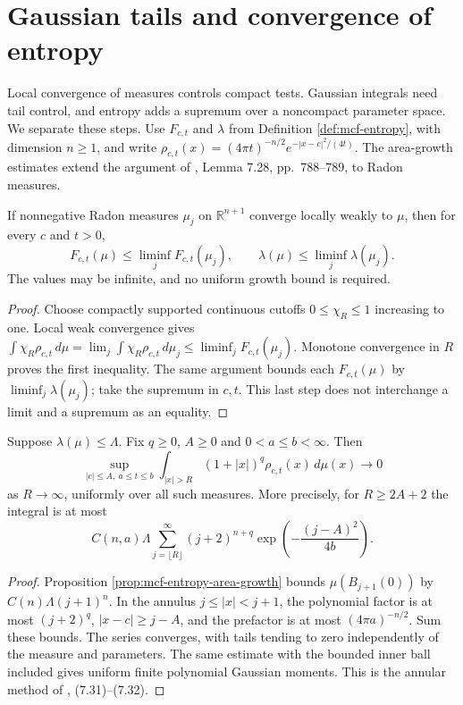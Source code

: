 \chapter{Gaussian tails and convergence of entropy}\label{sec:entropy-convergence}
Local convergence of measures controls compact tests. Gaussian integrals need tail control, and entropy adds a supremum over a noncompact parameter space. We separate these steps. Use $F_{c,t}$ and $\lambda$ from Definition \ref{def:mcf-entropy}, with dimension $n\geq1$, and write $\rho_{c,t}(x)=(4\pi t)^{-n/2}e^{-|x-c|^2/(4t)}$. The area-growth estimates extend the argument of \cite{CM12}, Lemma 7.28, pp.~788--789, to Radon measures.

\begin{proposition}\label{prop:entropy-lower-semicontinuity}
If nonnegative Radon measures $\mu_j$ on $\mathbb R^{n+1}$ converge locally weakly to $\mu$, then for every $c$ and $t>0$,
\[
 F_{c,t}(\mu)\leq\liminf_j F_{c,t}(\mu_j),\qquad
 \lambda(\mu)\leq\liminf_j\lambda(\mu_j).
\]
The values may be infinite, and no uniform growth bound is required.
\end{proposition}
\begin{proof}
Choose compactly supported continuous cutoffs $0\leq\chi_R\leq1$ increasing to one. Local weak convergence gives $\int\chi_R\rho_{c,t}\,d\mu=\lim_j\int\chi_R\rho_{c,t}\,d\mu_j\leq\liminf_jF_{c,t}(\mu_j)$. Monotone convergence in $R$ proves the first inequality. The same argument bounds each $F_{c,t}(\mu)$ by $\liminf_j\lambda(\mu_j)$; take the supremum in $c,t$. This last step does not interchange a limit and a supremum as an equality.
\end{proof}

\begin{lemma}\label{lem:entropy-gaussian-tails}
Suppose $\lambda(\mu)\leq\Lambda$. Fix $q\geq0$, $A\geq0$ and $0<a\leq b<\infty$. Then
\[
 \sup_{|c|\leq A,\ a\leq t\leq b}
 \int_{|x|>R}(1+|x|)^q\rho_{c,t}(x)\,d\mu(x)\longrightarrow0
\]
as $R\to\infty$, uniformly over all such measures. More precisely, for $R\geq2A+2$ the integral is at most
\[
 C(n,a)\Lambda\sum_{j=\lfloor R\rfloor}^{\infty}
 (j+2)^{n+q}\exp\left(-\frac{(j-A)^2}{4b}\right).
\]
\end{lemma}
\begin{proof}
Proposition \ref{prop:mcf-entropy-area-growth} bounds $\mu(B_{j+1}(0))$ by $C(n)\Lambda(j+1)^n$. In the annulus $j\leq|x|<j+1$, the polynomial factor is at most $(j+2)^q$, $|x-c|\geq j-A$, and the prefactor is at most $(4\pi a)^{-n/2}$. Sum these bounds. The series converges, with tails tending to zero independently of the measure and parameters. The same estimate with the bounded inner ball included gives uniform finite polynomial Gaussian moments. This is the annular method of \cite{CM12}, (7.31)--(7.32).
\end{proof}

